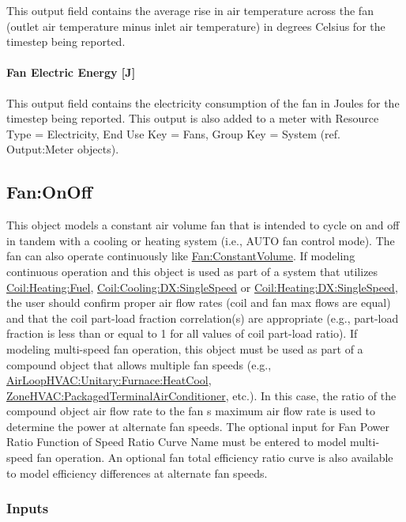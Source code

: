 This output field contains the average rise in air temperature across the fan (outlet air temperature minus inlet air temperature) in degrees Celsius for the timestep being reported.

\paragraph{Fan Electric Energy {[}J{]}}\label{fan-electric-energy-j}

This output field contains the electricity consumption of the fan in Joules for the timestep being reported. This output is also added to a meter with Resource Type = Electricity, End Use Key = Fans, Group Key = System (ref. Output:Meter objects).

\subsection{Fan:OnOff}\label{fanonoff}

This object models a constant air volume fan that is intended to cycle on and off in tandem with a cooling or heating system (i.e., AUTO fan control mode). The fan can also operate continuously like \hyperref[fanconstantvolume]{Fan:ConstantVolume}. If modeling continuous operation and this object is used as part of a system that utilizes \hyperref[coilheatinggas-000]{Coil:Heating:Fuel}, \hyperref[coilcoolingdxsinglespeed]{Coil:Cooling:DX:SingleSpeed} or \hyperref[coilheatingdxsinglespeed]{Coil:Heating:DX:SingleSpeed}, the user should confirm proper air flow rates (coil and fan max flows are equal) and that the coil part-load fraction correlation(s) are appropriate (e.g., part-load fraction is less than or equal to 1 for all values of coil part-load ratio). If modeling multi-speed fan operation, this object must be used as part of a compound object that allows multiple fan speeds (e.g., \hyperref[airloophvacunitaryfurnaceheatcool]{AirLoopHVAC:Unitary:Furnace:HeatCool}, \hyperref[zonehvacpackagedterminalairconditioner]{ZoneHVAC:PackagedTerminalAirConditioner}, etc.). In this case, the ratio of the compound object air flow rate to the fan s maximum air flow rate is used to determine the power at alternate fan speeds. The optional input for Fan Power Ratio Function of Speed Ratio Curve Name must be entered to model multi-speed fan operation. An optional fan total efficiency ratio curve is also available to model efficiency differences at alternate fan speeds.

\subsubsection{Inputs}\label{inputs-1-017}

